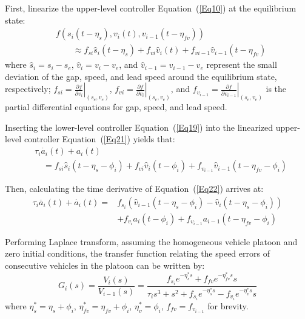 \documentclass[journal]{IEEEtran}
\begin{document}
First, linearize the upper-level controller Equation~(\ref{Eq10}) at the equilibrium state:
\begin{equation}
  \begin{aligned}
     & f\left(s_i\left(t-\eta_s\right),v_i\left(t\right),v_{i-1}\left(t-\eta_{fv}\right)\right)                                                   \\
     & \quad \quad \approx f_{si}{\hat{s}}_i\left(t-\eta_s\right)+f_{vi}{\hat{v}}_i\left(t\right)+f_{vi-1}{\hat{v}}_{i-1}\left(t-\eta_{fv}\right)
  \end{aligned}
  \label{Eq21}
\end{equation}
where ${\hat{s}}_i=s_i-s_e$, ${\hat{v}}_i=v_i-v_e$, and ${\hat{v}}_{i-1}=v_{i-1}-v_e$ represent the small deviation of the gap, speed, and lead speed around the equilibrium state, respectively; $f_{si}=\left.\frac{\partial f}{\partial v_i}\right|_{\left(s_e,v_e\right)}$, $f_{vi}=\left.\frac{\partial f}{\partial v_i}\right|_{\left(s_e,v_e\right)}$, and $f_{v_{i-1}}=\left.\frac{\partial f}{\partial v_{i-1}}\right|_{\left(s_e,v_e\right)}$ is the partial differential equations for gap, speed, and lead speed.

Inserting the lower-level controller Equation~(\ref{Eq19}) into the linearized upper-level controller Equation~(\ref{Eq21}) yields that:
\begin{equation}
  \begin{aligned}
     & \tau_i\dot{a_i}\left(t\right)+a_i\left(t\right) \\ & \quad =f_{si}{\hat{s}}_i\left(t-\eta_s-\phi_i\right)+f_{vi}{\hat{v}}_i\left(t-\phi_i\right)+f_{v_{i-1}}{\hat{v}}_{i-1}\left(t-\eta_{fv}-\phi_i\right)
  \end{aligned}
  \label{Eq22}
\end{equation}

Then, calculating the time derivative of Equation~(\ref{Eq22}) arrives at:
\begin{equation}
  \begin{aligned}
    \tau_i\ddot{a_i}\left(t\right)+\dot{a_i}\left(t\right)= & f_{s_i}\left({\hat{v}}_{i-1}\left(t-\eta_s-\phi_i\right)-{\hat{v}}_i\left(t-\eta_s-\phi_i\right)\right) \\
                                                            & +f_{v_i}a_i\left(t-\phi_i\right)+f_{v_{i-1}}a_{i-1}\left(t-\eta_{fv}-\phi_i\right)
  \end{aligned}
  \label{Eq23}
\end{equation}

Performing Laplace transform, assuming the homogeneous vehicle platoon and zero initial conditions, the transfer function relating the speed errors of consecutive vehicles in the platoon can be written by:
\begin{equation}
  G_i\left(s\right)=\frac{V_i\left(s\right)}{V_{i-1}\left(s\right)}=\frac{f_{s_i}e^{-\eta_s^\ast s}+f_{fv}e^{-\eta_{fv}^\ast s}s}{\tau_is^3+s^2+f_{s_i}e^{-\eta_s^\ast s}-f_{v_i}e^{-\eta_v^\ast s}s}
  \label{Eq24}
\end{equation}
where $\eta_s^\ast=\eta_s+\phi_i$, $\eta_{fv}^\ast=\eta_{fv}+\phi_i$, $\eta_v^\ast=\phi_i$, $f_{fv}=f_{v_{i-1}}$ for brevity.
\end{document}
